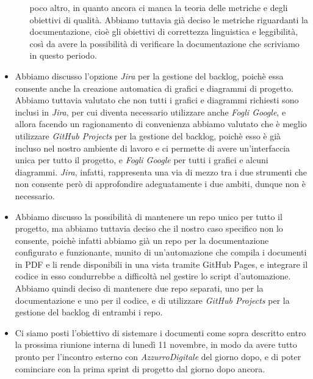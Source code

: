 \begin{itemize}
\begin{itemize}
        poco altro, in quanto ancora ci manca la teoria delle metriche e degli obiettivi di qualità. Abbiamo tuttavia già deciso le metriche riguardanti la
        documentazione, cioè gli obiettivi di correttezza linguistica e leggibilità, così da avere la possibilità di verificare la documentazione che 
        scriviamo in questo periodo.
    \end{itemize}
    \item Abbiamo discusso l'opzione \emph{Jira} per la gestione del backlog, poichè essa consente anche la creazione automatica di grafici e diagrammi di
    progetto. Abbiamo tuttavia valutato che non tutti i grafici e diagrammi richiesti sono inclusi in \emph{Jira}, per cui diventa necessario utilizzare
    anche \emph{Fogli Google}, e allora facendo un ragionamento di convenienza abbiamo valutato che è meglio utilizzare \emph{GitHub Projects} per la gestione
    del backlog, poichè esso è già incluso nel nostro ambiente di lavoro e ci permette di avere un'interfaccia unica per tutto il progetto, e 
    \emph{Fogli Google} per tutti i grafici e alcuni diagrammi. \emph{Jira}, infatti, rappresenta una via di mezzo tra i due strumenti che non consente però
    di approfondire adeguatamente i due ambiti, dunque non è necessario.
    \item Abbiamo discusso la possibilità di mantenere un repo unico per tutto il progetto, ma abbiamo tuttavia deciso che il nostro caso specifico non lo
    consente, poichè infatti abbiamo già un repo per la documentazione configurato e funzionante, munito di un'automazione che compila i documenti in PDF
    e li rende disponibili in una vista tramite GitHub Pages, e integrare il codice in esso condurrebbe a difficoltà nel gestire lo script d'automazione.
    Abbiamo quindi deciso di mantenere due repo separati, uno per la documentazione e uno per il codice, e di utilizzare \emph{GitHub Projects} per la
    gestione del backlog di entrambi i repo.
    \item Ci siamo posti l'obiettivo di sistemare i documenti come sopra descritto entro la prossima riunione interna di lunedì 11 novembre, 
    in modo da avere tutto pronto per l'incontro esterno con \emph{AzzurroDigitale} del giorno dopo, e di poter cominciare con la prima sprint 
    di progetto dal giorno dopo ancora.
\end{itemize}
